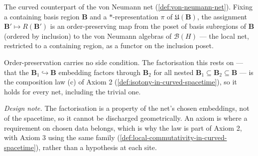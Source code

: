 \begin{definition}
    \label{def:von-neumann-net-in-curved-spacetime}
    \leanok
    The curved counterpart of the von Neumann net (\ref{def:von-neumann-net}). Fixing a containing basis region $\mathbf{B}$ and a $*$-representation $\pi$ of $\mathfrak{U}(\mathbf{B})$, the assignment $\mathbf{B}' \mapsto R(\mathbf{B}')$ is an order-preserving map from the poset of basis subregions of $\mathbf{B}$ (ordered by inclusion) to the von Neumann algebras of $\mathcal{B}(H)$ --- the local net, restricted to a containing region, as a functor on the inclusion poset.

    Order-preservation carries no side condition. The factorisation this rests on --- that the $\mathbf{B}_1 \hookrightarrow \mathbf{B}$ embedding factors through $\mathbf{B}_2$ for all nested $\mathbf{B}_1 \subseteq \mathbf{B}_2 \subseteq \mathbf{B}$ --- is the composition law (c) of Axiom 2 (\ref{def:isotony-in-curved-spacetime}), so it holds for every net, including the trivial one.

    \emph{Design note.} The factorisation is a property of the net's chosen embeddings, not of the spacetime, so it cannot be discharged geometrically. An axiom is where a requirement on chosen data belongs, which is why the law is part of Axiom 2, with Axiom 3 using the same family (\ref{def:local-commutativity-in-curved-spacetime}), rather than a hypothesis at each site.
\end{definition}

